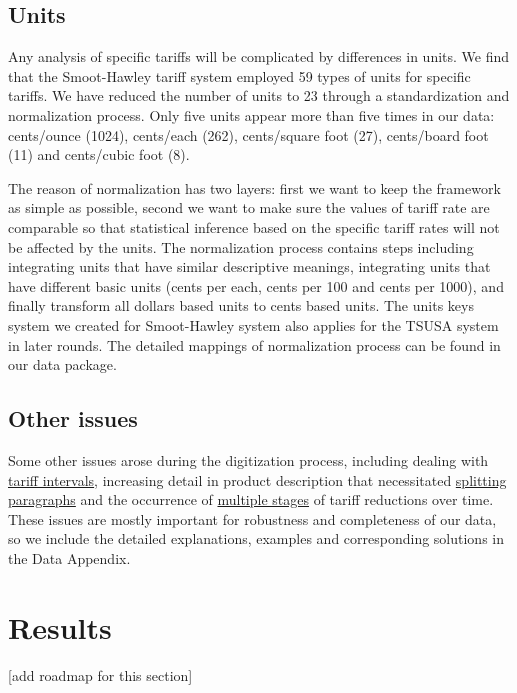 \documentclass[
  12pt,
]{article}
\begin{document}
\hypertarget{units}{%
\subsection{Units}\label{units}}

Any analysis of specific tariffs will be complicated by differences in units. We find that the Smoot-Hawley tariff system employed 59 types of units for specific tariffs. We have reduced the number of units to 23 through a standardization and normalization process. Only five units appear more than five times in our data: cents/ounce (1024), cents/each (262), cents/square foot (27), cents/board foot (11) and cents/cubic foot (8).

The reason of normalization has two layers: first we want to keep the framework as simple as possible, second we want to make sure the values of tariff rate are comparable so that statistical inference based on the specific tariff rates will not be affected by the units. The normalization process contains steps including integrating units that have similar descriptive meanings, integrating units that have different basic units (cents per each, cents per 100 and cents per 1000), and finally transform all dollars based units to cents based units. The units keys system we created for Smoot-Hawley system also applies for the TSUSA system in later rounds. The detailed mappings of normalization process can be found in our data package.

\hypertarget{other-issues}{%
\subsection{Other issues}\label{other-issues}}

Some other issues arose during the digitization process, including dealing with \protect\hyperlink{int}{tariff intervals}, increasing detail in product description that necessitated \protect\hyperlink{split}{splitting paragraphs} and the occurrence of \protect\hyperlink{staging}{multiple stages} of tariff reductions over time. These issues are mostly important for robustness and completeness of our data, so we include the detailed explanations, examples and corresponding solutions in the Data Appendix.

\hypertarget{results}{%
\section{Results}\label{results}}

{[}add roadmap for this section{]}
\end{document}
